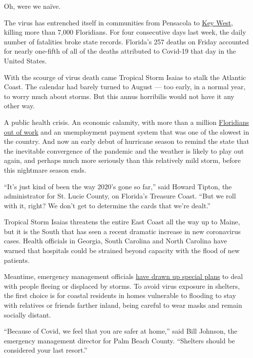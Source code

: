 Oh, were we naïve.

The virus has entrenched itself in communities from Pensacola to
\href{https://www.nytimes.com/2020/07/31/us/coronavirus-masks-enforcement-key-west.html?referringSource=articleShare}{Key
West}, killing more than 7,000 Floridians. For four consecutive days
last week, the daily number of fatalities broke state records. Florida's
257 deaths on Friday accounted for nearly one-fifth of all of the deaths
attributed to Covid-19 that day in the United States.

With the scourge of virus death came Tropical Storm Isaias to stalk the
Atlantic Coast. The calendar had barely turned to August --- too early,
in a normal year, to worry much about storms. But this annus horribilis
would not have it any other way.

A public health crisis. An economic calamity, with more than a million
\href{https://www.nytimes.com/2020/04/23/us/florida-coronavirus-unemployment.html}{Floridians
out of work} and an unemployment payment system that was one of the
slowest in the country. And now an early debut of hurricane season to
remind the state that the inevitable convergence of the pandemic and the
weather is likely to play out again, and perhaps much more seriously
than this relatively mild storm, before this nightmare season ends.

``It's just kind of been the way 2020's gone so far,'' said Howard
Tipton, the administrator for St. Lucie County, on Florida's Treasure
Coast. ``But we roll with it, right? We don't get to determine the cards
that we're dealt.''

Tropical Storm Isaias threatens the entire East Coast all the way up to
Maine, but it is the South that has seen a recent dramatic increase in
new coronavirus cases. Health officials in Georgia, South Carolina and
North Carolina have warned that hospitals could be strained beyond
capacity with the flood of new patients.

Meantime, emergency management officials
\href{https://www.nytimes.com/2020/05/24/us/hurricane-pandemic-coronavirus-florida.html}{have
drawn up special plans} to deal with people fleeing or displaced by
storms. To avoid virus exposure in shelters, the first choice is for
coastal residents in homes vulnerable to flooding to stay with relatives
or friends farther inland, being careful to wear masks and remain
socially distant.

``Because of Covid, we feel that you are safer at home,'' said Bill
Johnson, the emergency management director for Palm Beach County.
``Shelters should be considered your last resort.''

